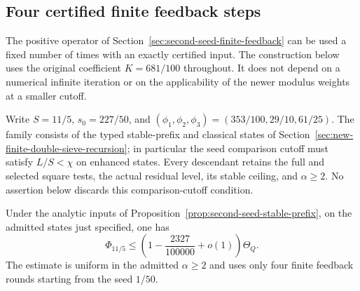 \subsection{Four certified finite feedback steps}
\label{sec:second-seed-certified-finite-feedback}

The positive operator of Section~\ref{sec:second-seed-finite-feedback}
can be used a fixed number of times with an exactly certified input.
The construction below uses the original coefficient $K=681/100$
throughout. It does not depend on a numerical infinite iteration or
on the applicability of the newer modulus weights at a smaller cutoff.

Write $S=11/5$, $s_0=227/50$, and
$(\phi_1,\phi_2,\phi_3)=(353/100,29/10,61/25)$.
The family consists of the typed stable-prefix and classical states
of Section~\ref{sec:new-finite-double-sieve-recursion}; in particular
the seed comparison cutoff must satisfy $L/S<\chi$ on enhanced
states. Every descendant retains the full and selected square tests,
the actual residual level, its stable ceiling, and $\alpha\ge2$.
No assertion below discards this comparison-cutoff condition.

\begin{proposition}
\label{prop:second-seed-certified-finite-feedback}
Under the analytic inputs of
Proposition~\ref{prop:second-seed-stable-prefix}, on the admitted
states just specified, one has
\[
 \Phi_{11/5}\le
 \left(1-\frac{2327}{100000}+o(1)\right)\Theta_Q.
\]
The estimate is uniform in the admitted $\alpha\ge2$ and uses only
four finite feedback rounds starting from the seed $1/50$.
\end{proposition}

